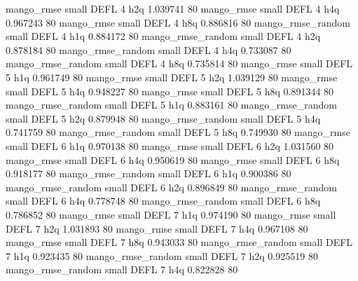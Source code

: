        mango_rmse      small     DEFL                 4                  h2q 1.039741 80
       mango_rmse      small     DEFL                 4                  h4q 0.967243 80
       mango_rmse      small     DEFL                 4                  h8q 0.886816 80
mango_rmse_random      small     DEFL                 4                  h1q 0.884172 80
mango_rmse_random      small     DEFL                 4                  h2q 0.878184 80
mango_rmse_random      small     DEFL                 4                  h4q 0.733087 80
mango_rmse_random      small     DEFL                 4                  h8q 0.735814 80
       mango_rmse      small     DEFL                 5                  h1q 0.961749 80
       mango_rmse      small     DEFL                 5                  h2q 1.039129 80
       mango_rmse      small     DEFL                 5                  h4q 0.948227 80
       mango_rmse      small     DEFL                 5                  h8q 0.891344 80
mango_rmse_random      small     DEFL                 5                  h1q 0.883161 80
mango_rmse_random      small     DEFL                 5                  h2q 0.879948 80
mango_rmse_random      small     DEFL                 5                  h4q 0.741759 80
mango_rmse_random      small     DEFL                 5                  h8q 0.749930 80
       mango_rmse      small     DEFL                 6                  h1q 0.970138 80
       mango_rmse      small     DEFL                 6                  h2q 1.031560 80
       mango_rmse      small     DEFL                 6                  h4q 0.950619 80
       mango_rmse      small     DEFL                 6                  h8q 0.918177 80
mango_rmse_random      small     DEFL                 6                  h1q 0.900386 80
mango_rmse_random      small     DEFL                 6                  h2q 0.896849 80
mango_rmse_random      small     DEFL                 6                  h4q 0.778748 80
mango_rmse_random      small     DEFL                 6                  h8q 0.786852 80
       mango_rmse      small     DEFL                 7                  h1q 0.974190 80
       mango_rmse      small     DEFL                 7                  h2q 1.031893 80
       mango_rmse      small     DEFL                 7                  h4q 0.967108 80
       mango_rmse      small     DEFL                 7                  h8q 0.943033 80
mango_rmse_random      small     DEFL                 7                  h1q 0.923435 80
mango_rmse_random      small     DEFL                 7                  h2q 0.925519 80
mango_rmse_random      small     DEFL                 7                  h4q 0.822828 80
